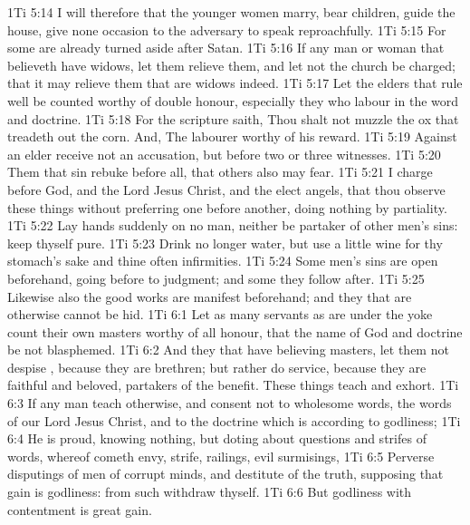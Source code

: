 \vs 1Ti 5:14 I will therefore that the younger women marry, bear children, guide the house, give none occasion to the adversary to speak reproachfully.
\vs 1Ti 5:15 For some are already turned aside after Satan.
\vs 1Ti 5:16 If any man or woman that believeth have widows, let them relieve them, and let not the church be charged; that it may relieve them that are widows indeed.
\vs 1Ti 5:17 Let the elders that rule well be counted worthy of double honour, especially they who labour in the word and doctrine.
\vs 1Ti 5:18 For the scripture saith, Thou shalt not muzzle the ox that treadeth out the corn. And, The labourer  worthy of his reward.
\vs 1Ti 5:19 Against an elder receive not an accusation, but before two or three witnesses.
\vs 1Ti 5:20 Them that sin rebuke before all, that others also may fear.
\vs 1Ti 5:21 I charge  before God, and the Lord Jesus Christ, and the elect angels, that thou observe these things without preferring one before another, doing nothing by partiality.
\vs 1Ti 5:22 Lay hands suddenly on no man, neither be partaker of other men's sins: keep thyself pure.
\vs 1Ti 5:23 Drink no longer water, but use a little wine for thy stomach's sake and thine often infirmities.
\vs 1Ti 5:24 Some men's sins are open beforehand, going before to judgment; and some  they follow after.
\vs 1Ti 5:25 Likewise also the good works  are manifest beforehand; and they that are otherwise cannot be hid.
\vs 1Ti 6:1 Let as many servants as are under the yoke count their own masters worthy of all honour, that the name of God and  doctrine be not blasphemed.
\vs 1Ti 6:2 And they that have believing masters, let them not despise , because they are brethren; but rather do  service, because they are faithful and beloved, partakers of the benefit. These things teach and exhort.
\vs 1Ti 6:3 If any man teach otherwise, and consent not to wholesome words,  the words of our Lord Jesus Christ, and to the doctrine which is according to godliness;
\vs 1Ti 6:4 He is proud, knowing nothing, but doting about questions and strifes of words, whereof cometh envy, strife, railings, evil surmisings,
\vs 1Ti 6:5 Perverse disputings of men of corrupt minds, and destitute of the truth, supposing that gain is godliness: from such withdraw thyself.
\vs 1Ti 6:6 But godliness with contentment is great gain.
